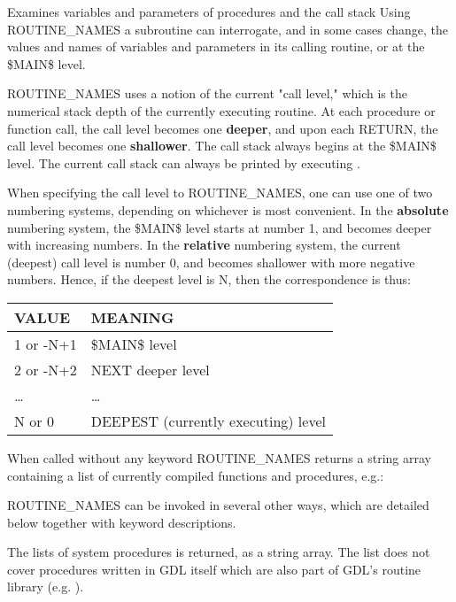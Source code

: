 %
Examines variables and parameters of procedures and the call stack
Using ROUTINE\_NAMES a subroutine can interrogate, and in some cases change, 
the values and names of  variables and parameters in its calling routine, or at 
the \$MAIN\$ level. 

ROUTINE\_NAMES uses a notion of the current "call level," which
is the numerical stack depth of the currently executing routine.
At each procedure or function call, the call level becomes one
{\bf deeper}, and upon each RETURN, the call level becomes one
{\bf shallower}.  The call stack always begins at the \$MAIN\$ level.
The current call stack can always be printed by executing .

When specifying the call level to ROUTINE\_NAMES, one can use one
of two numbering systems, depending on whichever is most
convenient.  In the {\bf absolute} numbering system, the \$MAIN\$ level
starts at number 1, and becomes deeper with increasing numbers.
In the {\bf relative} numbering system, the current (deepest) call
level is number 0, and becomes shallower with more negative numbers.  
Hence, if the deepest level is N, then the correspondence is thus:

\begin{tabular}{ll}
      VALUE      &  MEANING            \\ \hline
      1 or -N+1  &  \$MAIN\$ level     \\
      2 or -N+2  &  NEXT deeper level  \\
        \ldots   &       \ldots        \\
      N or 0     &  DEEPEST (currently executing) level
\end{tabular}

When called without any keyword ROUTINE\_NAMES returns a string array
containing a list of currently compiled functions and procedures, e.g.:


ROUTINE\_NAMES can be invoked in several other ways, which are detailed below
together with keyword descriptions.

%
%
The lists of system procedures is returned, as a string array.
The list does not cover procedures written in GDL itself which
are also part of GDL's routine library (e.g. ).

